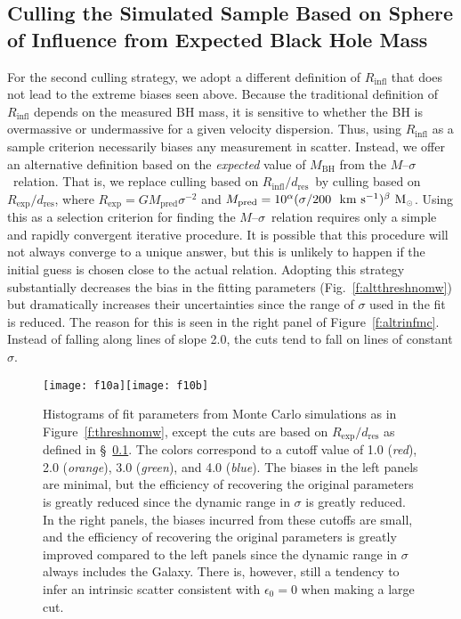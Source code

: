 \documentclass[twosided,letterpaper,numberedappendix]{emulateapj}
\newcommand{\msun}     {\ensuremath{{\rm M}_{\scriptscriptstyle \odot}}}
\newcommand{\kms}      {\ensuremath{~\mathrm{km~s^{-1}}}}
\newcommand{\msigma}   {\ensuremath{M}{--}\ensuremath{\sigma}}
\newcommand{\rinfres} {\ensuremath{R_{\mathrm{infl}} / d_{\mathrm{res}}}}
\begin{document}
\subsection{Culling the Simulated Sample Based on Sphere of Influence 
from Expected Black Hole Mass}
\label{mcfaberthresh}
For the second culling strategy, we adopt a different definition of
$R_\mathrm{infl}$ that does not lead to the extreme biases seen above.
Because the traditional definition of $R_\mathrm{infl}$ depends on the
measured BH mass, it is sensitive to whether the BH is overmassive or
undermassive for a given velocity dispersion.  Thus, using
$R_\mathrm{infl}$ as a sample criterion necessarily biases any
measurement in scatter.  Instead, we offer an alternative definition
based on the \emph{expected} value of $M_\mathrm{BH}$ from the
\msigma\ relation.  That is, we replace culling based on \rinfres\ by
culling based on $R_{\mathrm{exp}}/d_{\mathrm{res}}$, where
$R_\mathrm{exp} = G M_\mathrm{pred} \sigma^{-2}$ and $M_\mathrm{pred}
= 10^\alpha (\sigma / 200~\kms)^\beta~\msun$.  Using this as a
selection criterion for finding the \msigma\ relation requires only a
simple and rapidly convergent iterative procedure.  It is possible
that this procedure will not always converge to a unique answer, but
this is unlikely to happen if the initial guess is chosen close to
the actual relation.  Adopting this strategy substantially decreases
the bias in the fitting parameters (Fig.~\ref{f:altthreshnomw}) but
dramatically increases their uncertainties since the range of $\sigma$
used in the fit is reduced.  The reason for this is seen in the right
panel of Figure~\ref{f:altrinfmc}.  Instead of falling along lines of
slope 2.0, the cuts tend to fall on lines of constant $\sigma$.



\begin{figure*}
\centering
\hbox{\hspace{-1.5cm}\texttt{[image: f10a]}\hspace{-1cm}\texttt{[image: f10b]}}
\caption{Histograms of fit parameters from Monte Carlo simulations as
in Figure~\ref{f:threshnomw}, except the cuts are based on
$R_{\mathrm{exp}}/d_{\mathrm{res}}$ as defined in
\S~\ref{mcfaberthresh}.  The colors correspond to a cutoff value of
1.0 (\emph{red}), 2.0 (\emph{orange}), 3.0 (\emph{green}), and 4.0
(\emph{blue}).  The biases in the left panels are minimal, but the
efficiency of recovering the original parameters is greatly reduced
since the dynamic range in $\sigma$ is greatly reduced.  In the right
panels, the biases incurred from these cutoffs are small, and the
efficiency of recovering the original parameters is greatly improved
compared to the left panels since the dynamic range in $\sigma$ always
includes the Galaxy.  There is, however, still a tendency to infer an
intrinsic scatter consistent with $\epsilon_0 = 0$ when making a large
cut.
\bigskip
}
\label{f:altthreshnomw}
\label{f:altthreshmw}
\end{figure*}
\end{document}
